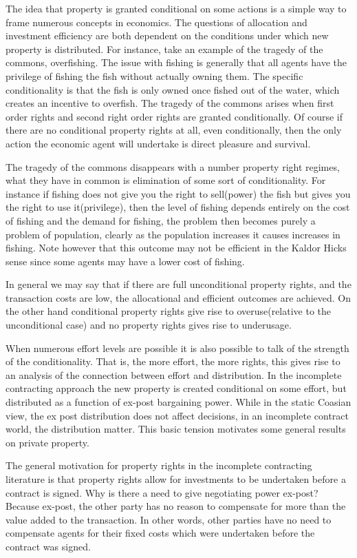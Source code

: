 \documentclass[12pt]{article}
\numberwithin{equation}{section}
\begin{document}
The idea that property is granted conditional on some actions is a simple way to frame numerous concepts in economics. The questions of allocation and investment efficiency are both dependent on the conditions under which new property is distributed. For instance, take an example of the tragedy of the commons, overfishing. The issue with fishing is generally that all agents have the privilege of fishing the fish without actually owning them. The specific conditionality is that the fish is only owned once fished out of the water, which creates an incentive to overfish. The tragedy of the commons arises when first order rights and second right order rights are granted conditionally. Of course if there are no conditional property rights at all, even conditionally, then the only action the economic agent will undertake is direct pleasure and survival. 

The tragedy of the commons disappears with a number property right regimes, what they have in common is elimination of some sort of conditionality. For instance if fishing does not give you the right to sell(power) the fish but gives you the right to use it(privilege), then the level of fishing depends entirely on the cost of fishing and the demand for fishing, the problem then becomes purely a problem of population, clearly as the population increases it causes increases in fishing. Note however that this outcome may not be efficient in the Kaldor Hicks sense since some agents may have a lower cost of fishing. 

In general we may say that if there are full unconditional property rights, and the transaction costs are low, the allocational and efficient outcomes are achieved. On the other hand conditional property rights give rise to overuse(relative to the unconditional case) and no property rights gives rise to underusage. 

When numerous effort levels are possible it is also possible to talk of the strength of the conditionality. That is, the more effort, the more rights, this gives rise to an analysis of the connection between effort and distribution. In the incomplete contracting approach the new property is created conditional on some effort, but distributed as a function of ex-post bargaining power. While in the static Coasian view, the ex post distribution does not affect decisions, in an incomplete contract world, the distribution matter. This basic tension motivates some general results on private property. 

The general motivation for property rights in the incomplete contracting literature is that property rights allow for investments to be undertaken before a contract is signed. Why is there a need to give negotiating power ex-post? Because ex-post, the other party has no reason to compensate for more than the value added to the transaction. In other words, other parties have no need to compensate agents for their fixed costs which were undertaken before the contract was signed. 
\end{document}
